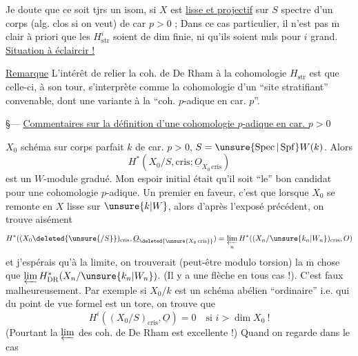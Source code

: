 Je doute que ce soit tjrs un isom,  si $X$ est \uline{lisse et projectif}  sur $S$ spectre d'un corps (alg. clos si on veut) de car $p>0$ ;  Dans ce cas particulier, il n'est pas $\overline{\mathrm m}$ clair à priori que les $H^i_{\mathrm{str}}$ soient de dim finie, ni qu'ils soient nuls pour $i$ grand.
\uline{Situation à éclaircir !}

\uline{Remarque} L'intérêt de relier la coh. de De Rham à la cohomologie  $H_{\mathrm{str}}$ est que celle-ci, à son tour, s'interprète comme la cohomologie d'un ``site stratifiant'' convenable, dont une variante   à la ``coh. $p$-adique en car. $p$''.

\S--- \uline{Commentaires sur la définition d'une cohomologie $p$-adique en car. $p>0$}

$X_0$ schéma sur corps parfait $k$ de car. $p>0$, $S=\unsure{\operatorname{Spec}|\operatorname{Spf}}W(k)$. Alors
\[
H^*(X_0/S,\mathrm{cris};\underline O_{X_0\,\mathrm{cris}})
\]
est un $W$-module gradué.  Mon espoir initial était qu'il soit  ``le'' bon candidat pour une cohomologie $p$-adique. Un premier   en faveur, c'est que lorsque $X_0$  se remonte en $X$  lisse sur $\unsure{k|W}$, alors d'après l'exposé précédent, on trouve aisément
\[
H^*((X_0\deleted{\unsure{/S}})_{\mathrm{cris}},\underline O_{\deleted{\unsure{X_0\,\mathrm{cris}}}})
=\varprojlim_n H^*((X_n/\unsure{k_n|W_n})_{\mathrm{cris}},O)
\]
et j'espérais qu'à la limite, on trouverait (peut-être modulo torsion) la $\overline{\mathrm m}$ chose que $\varprojlim H^*_{\mathrm{DR}}(X_n/\unsure{k_n|W_n})$.
(Il y  a une flèche en tous cas !).
C'est faux malheureusement. Par exemple si $X_0/k$ est un schéma abélien ``ordinaire'' i.e. qui du point de vue formel est un tore, on trouve que
\[
H^i((X_0/S)_{\mathrm{cris}},\underline O)=0\quad\text{si }i>\dim X_0\ !
\]
(Pourtant la $\varprojlim$ des coh. de De Rham est excellente !)
 Quand on regarde dans le cas

